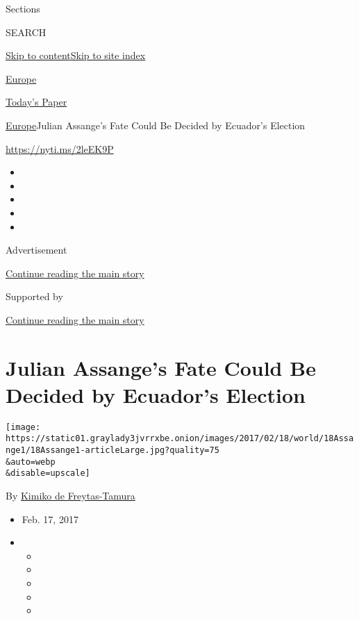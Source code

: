 Sections

SEARCH

\protect\hyperlink{site-content}{Skip to
content}\protect\hyperlink{site-index}{Skip to site index}

\href{https://www.nytimes3xbfgragh.onion/section/world/europe}{Europe}

\href{https://myaccount.nytimes3xbfgragh.onion/auth/login?response_type=cookie\&client_id=vi}{}

\href{https://www.nytimes3xbfgragh.onion/section/todayspaper}{Today's
Paper}

\href{/section/world/europe}{Europe}\textbar{}Julian Assange's Fate
Could Be Decided by Ecuador's Election

\url{https://nyti.ms/2leEK9P}

\begin{itemize}
\item
\item
\item
\item
\item
\end{itemize}

Advertisement

\protect\hyperlink{after-top}{Continue reading the main story}

Supported by

\protect\hyperlink{after-sponsor}{Continue reading the main story}

\hypertarget{julian-assanges-fate-could-be-decided-by-ecuadors-election}{%
\section{Julian Assange's Fate Could Be Decided by Ecuador's
Election}\label{julian-assanges-fate-could-be-decided-by-ecuadors-election}}

\texttt{[image: https://static01.graylady3jvrrxbe.onion/images/2017/02/18/world/18Assange1/18Assange1-articleLarge.jpg?quality=75\\\&auto=webp\\\&disable=upscale]}

By
\href{https://www.nytimes3xbfgragh.onion/by/kimiko-de-freytas-tamura}{Kimiko
de Freytas-Tamura}

\begin{itemize}
\item
  Feb. 17, 2017
\item
  \begin{itemize}
  \item
  \item
  \item
  \item
  \item
  \end{itemize}
\end{itemize}

